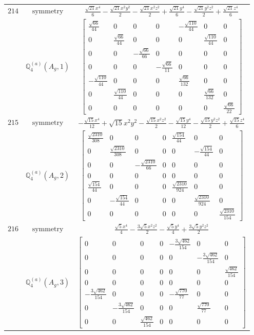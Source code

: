 \documentclass[fleqn,8pt,landscape]{jsarticle}
\begin{document}
\begin{longtable}{ccc}
$ 214 $ & $ \text{symmetry} $ & $ \frac{\sqrt{21} x^{4}}{6} - \frac{\sqrt{21} x^{2} y^{2}}{2} - \frac{\sqrt{21} x^{2} z^{2}}{2} + \frac{\sqrt{21} y^{4}}{6} - \frac{\sqrt{21} y^{2} z^{2}}{2} + \frac{\sqrt{21} z^{4}}{6} $ \\
$  $ & $ \mathbb{Q}_{4}^{(a)}(A_{g},1) $ & $ \begin{bmatrix} \frac{\sqrt{66}}{44} & 0 & 0 & 0 & - \frac{\sqrt{110}}{44} & 0 & 0 \\ 0 & \frac{\sqrt{66}}{44} & 0 & 0 & 0 & \frac{\sqrt{110}}{44} & 0 \\ 0 & 0 & - \frac{\sqrt{66}}{66} & 0 & 0 & 0 & 0 \\ 0 & 0 & 0 & - \frac{\sqrt{66}}{11} & 0 & 0 & 0 \\ - \frac{\sqrt{110}}{44} & 0 & 0 & 0 & \frac{\sqrt{66}}{132} & 0 & 0 \\ 0 & \frac{\sqrt{110}}{44} & 0 & 0 & 0 & \frac{\sqrt{66}}{132} & 0 \\ 0 & 0 & 0 & 0 & 0 & 0 & \frac{\sqrt{66}}{22} \end{bmatrix} $ \\ \hline
$ 215 $ & $ \text{symmetry} $ & $ - \frac{\sqrt{15} x^{4}}{12} + \sqrt{15} x^{2} y^{2} - \frac{\sqrt{15} x^{2} z^{2}}{2} - \frac{\sqrt{15} y^{4}}{12} - \frac{\sqrt{15} y^{2} z^{2}}{2} + \frac{\sqrt{15} z^{4}}{6} $ \\
$  $ & $ \mathbb{Q}_{4}^{(a)}(A_{g},2) $ & $ \begin{bmatrix} \frac{\sqrt{2310}}{308} & 0 & 0 & 0 & \frac{\sqrt{154}}{44} & 0 & 0 \\ 0 & \frac{\sqrt{2310}}{308} & 0 & 0 & 0 & - \frac{\sqrt{154}}{44} & 0 \\ 0 & 0 & - \frac{\sqrt{2310}}{66} & 0 & 0 & 0 & 0 \\ 0 & 0 & 0 & 0 & 0 & 0 & 0 \\ \frac{\sqrt{154}}{44} & 0 & 0 & 0 & \frac{\sqrt{2310}}{924} & 0 & 0 \\ 0 & - \frac{\sqrt{154}}{44} & 0 & 0 & 0 & \frac{\sqrt{2310}}{924} & 0 \\ 0 & 0 & 0 & 0 & 0 & 0 & \frac{\sqrt{2310}}{154} \end{bmatrix} $ \\ \hline
$ 216 $ & $ \text{symmetry} $ & $ \frac{\sqrt{5} x^{4}}{4} - \frac{3 \sqrt{5} x^{2} z^{2}}{2} - \frac{\sqrt{5} y^{4}}{4} + \frac{3 \sqrt{5} y^{2} z^{2}}{2} $ \\
$  $ & $ \mathbb{Q}_{4}^{(a)}(A_{g},3) $ & $ \begin{bmatrix} 0 & 0 & 0 & 0 & - \frac{3 \sqrt{462}}{154} & 0 & 0 \\ 0 & 0 & 0 & 0 & 0 & - \frac{3 \sqrt{462}}{154} & 0 \\ 0 & 0 & 0 & 0 & 0 & 0 & \frac{\sqrt{462}}{154} \\ 0 & 0 & 0 & 0 & 0 & 0 & 0 \\ - \frac{3 \sqrt{462}}{154} & 0 & 0 & 0 & - \frac{\sqrt{770}}{77} & 0 & 0 \\ 0 & - \frac{3 \sqrt{462}}{154} & 0 & 0 & 0 & \frac{\sqrt{770}}{77} & 0 \\ 0 & 0 & \frac{\sqrt{462}}{154} & 0 & 0 & 0 & 0 \end{bmatrix} $ \\ \hline

\end{longtable}
\end{document}
